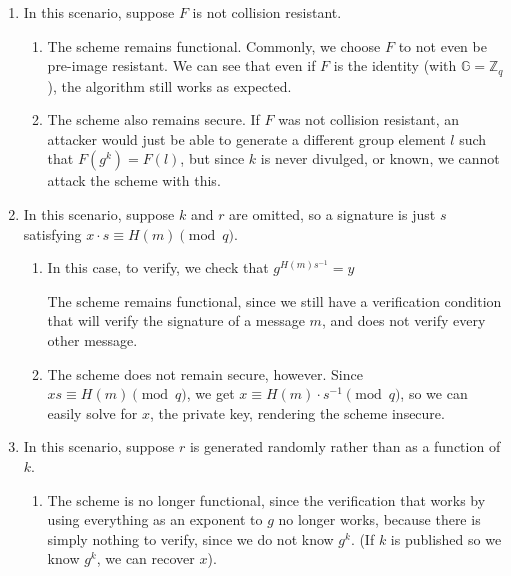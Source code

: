 \begin{enumerate}
      \item
        In this scenario, suppose $F$ is not collision resistant.

        \begin{enumerate}
          \item
            The scheme remains functional. Commonly, we choose $F$ to not even be pre-image resistant. We can see that even if $F$ is the identity (with $\mathbb{G} = \mathbb{Z}_q$), the algorithm still works as expected.

          \item
            The scheme also remains secure. If $F$ was not collision resistant, an attacker would just be able to generate a different group element $l$ such that $F(g^k) = F(l)$, but since $k$ is never divulged, or known, we cannot attack the scheme with this.
        \end{enumerate}

      \item
        In this scenario, suppose $k$ and $r$ are omitted, so a signature is just $s$ satisfying $x \cdot s \equiv H(m) \pmod {q}$.

        \begin{enumerate}
          \item
            In this case, to verify, we check that $g^{H(m)s^{-1}} = y$

            The scheme remains functional, since we still have a verification condition that will verify the signature of a message $m$, and does not verify every other message.

          \item
            The scheme does not remain secure, however. Since $xs \equiv H(m) \pmod{q}$, we get $x \equiv H(m) \cdot s^{-1} \pmod{q}$, so we can easily solve for $x$, the private key, rendering the scheme insecure.
        \end{enumerate}

      \item

        In this scenario, suppose $r$ is generated randomly rather than as a function of $k$.

        \begin{enumerate}
          \item
            The scheme is no longer functional, since the verification that works by using everything as an exponent to $g$ no longer works, because there is simply nothing to verify, since we do not know $g^k$. (If $k$ is published so we know $g^k$, we can recover $x$).


\end{enumerate}
\end{enumerate}
